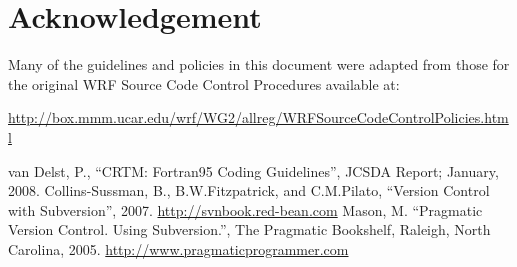%
%
%
%
%
%
%
%

\section*{Acknowledgement}
Many of the guidelines and policies in this document were adapted from those for the original WRF Source Code Control Procedures available at:

\href{http://box.mmm.ucar.edu/wrf/WG2/allreg/WRFSourceCodeControlPolicies.html}{http://box.mmm.ucar.edu/wrf/WG2/allreg/WRFSourceCodeControlPolicies.html}


\begin{thebibliography}{99}
   van Delst, P., ``CRTM: Fortran95 Coding Guidelines'', JCSDA Report; January, 2008.
   Collins-Sussman, B., B.W.Fitzpatrick, and C.M.Pilato, ``Version Control with Subversion'', 2007. \href{http://svnbook.red-bean.com}{http://svnbook.red-bean.com}
   Mason, M. ``Pragmatic Version Control. Using Subversion.'', The Pragmatic Bookshelf, Raleigh, North Carolina, 2005. \href{http://www.pragmaticprogrammer.com}{http://www.pragmaticprogrammer.com}
\end{thebibliography}

\begin{appendix}
\end{appendix}



